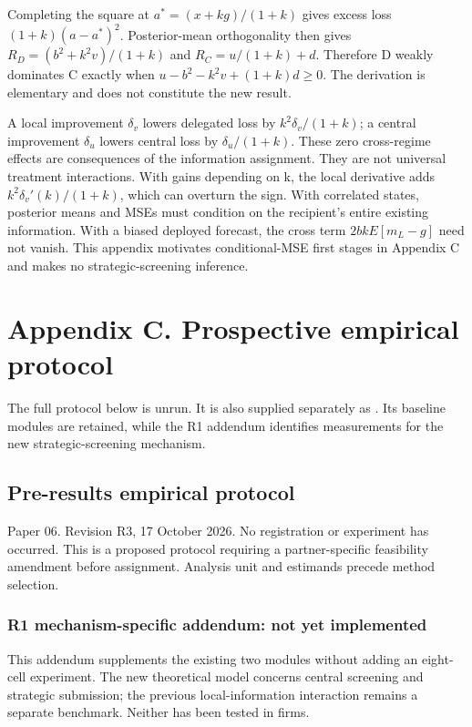 \documentclass[
  11pt,
]{article}
\begin{document}
Completing the square at \(a^*=(x+kg)/(1+k)\) gives excess loss
\((1+k)(a-a^*)^2\). Posterior-mean orthogonality then gives
\(R_D=(b^2+k^2v)/(1+k)\) and \(R_C=u/(1+k)+d\). Therefore D weakly
dominates C exactly when \(u-b^2-k^2v+(1+k)d\geq0\). The derivation is
elementary and does not constitute the new result.

A local improvement \(\delta_v\) lowers delegated loss by
\(k^2\delta_v/(1+k)\); a central improvement \(\delta_u\) lowers central
loss by \(\delta_u/(1+k)\). These zero cross-regime effects are
consequences of the information assignment. They are not universal
treatment interactions. With gains depending on k, the local derivative
adds \(k^2\delta_v'(k)/(1+k)\), which can overturn the sign. With
correlated states, posterior means and MSEs must condition on the
recipient's entire existing information. With a biased deployed
forecast, the cross term \(2bkE[m_L-g]\) need not vanish. This appendix
motivates conditional-MSE first stages in Appendix C and makes no
strategic-screening inference.

\section{Appendix C. Prospective empirical
protocol}\label{appendix-c.-prospective-empirical-protocol}

The full protocol below is unrun. It is also supplied separately as
. Its baseline modules are
retained, while the R1 addendum identifies measurements for the new
strategic-screening mechanism.

\subsection{Pre-results empirical
protocol}\label{pre-results-empirical-protocol}

Paper 06. Revision R3, 17 October 2026. No registration or experiment
has occurred. This is a proposed protocol requiring a partner-specific
feasibility amendment before assignment. Analysis unit and estimands
precede method selection.

\subsubsection{R1 mechanism-specific addendum: not yet
implemented}\label{r1-mechanism-specific-addendum-not-yet-implemented}

This addendum supplements the existing two modules without adding an
eight-cell experiment. The new theoretical model concerns central
screening and strategic submission; the previous local-information
interaction remains a separate benchmark. Neither has been tested in
firms.
\end{document}
